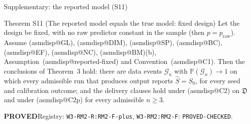 \documentclass[aspectratio=169]{beamer}
\makeatletter
\newcommand{\asmdisp}[1]{\csname asmdisp@#1\endcsname}
\newcommand{\as}[1]{\textup{(\asmdisp{#1})}}
\renewcommand{\P}{\mathbb{P}}
\newcommand{\praw}{p_{\mathrm{raw}}}
\newcommand{\Sz}{S_0}
\newcommand{\Shat}{\hat S}
\newcommand{\Dom}{\mathfrak D}
\newcommand{\rid}[1]{\texttt{#1}}
\makeatother
\begin{document}
\begin{frame}{Supplementary: the reported model (S11)}
\footnotesize
\begin{block}{Theorem S11 (The reported model equals the true model: fixed design)}
Let the design be fixed, with no raw predictor constant in the sample (then $p=\praw$). Assume \as{GL}, \as{DIM}, \as{SP},
\as{BC}, \as{EF}, \as{NC}, \as{BM}(b), Assumption~\as{reported-fixed} and Convention~\as{C1}. Then the conclusions of
Theorem~3 hold: there are data events $\mathcal G_n$ with $\P(\mathcal G_n)\to1$ on which every
admissible run that produces output reports $\Shat=\Sz$, for every seed and calibration outcome; and the delivery
clauses hold under \as{C2} on $\Dom$ and under \as{C2p} for every admissible $n\ge3$.
\end{block}
{\footnotesize \textbf{PROVED}\quad Registry: \rid{W3-RM2-R:RM2-F-plus}, \rid{W3-RM2:RM2-F}: \rid{PROVED-CHECKED}.}

\end{frame}
\end{document}
